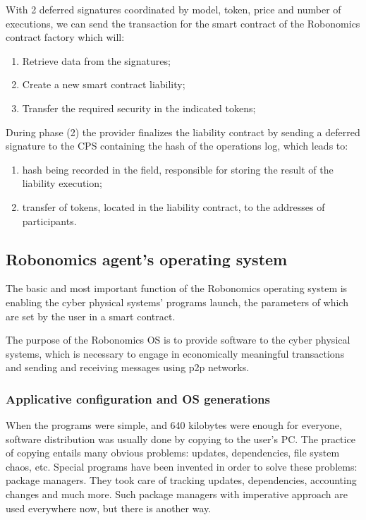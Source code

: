 \documentclass{article}
\begin{document}
With 2 deferred signatures coordinated by model, token, price and number of executions, we can send the transaction for the smart contract of the Robonomics contract factory which will:

\begin{enumerate}
	\item Retrieve data from the signatures;
	\item Create a new smart contract liability;
	\item Transfer the required security in the indicated tokens;
\end{enumerate}

During phase (2) the provider finalizes the liability contract by sending a deferred signature to the CPS containing the hash of the operations log, which leads to:
\begin{enumerate}
	\item hash being recorded in the field, responsible for storing the result of the liability execution;
	\item transfer of tokens, located in the liability contract, to the addresses of participants.
\end{enumerate}

\subsection{Robonomics agent's operating system}

The basic and most important function of the Robonomics operating system is enabling the cyber physical systems' programs launch, the parameters of which are set by the user in a smart contract.

The purpose of the Robonomics OS is to provide software to the cyber physical systems, which is necessary to engage in economically meaningful transactions and sending and receiving messages using p2p networks.

\subsubsection{Applicative configuration and OS generations}
When the programs were simple, and 640 kilobytes were enough for everyone, software distribution was usually done by copying to the user's PC. The practice of copying entails many obvious problems: updates, dependencies, file system chaos, etc. Special programs have been invented in order to solve these problems: package managers. They took care of tracking updates, dependencies, accounting changes and much more. Such package managers with imperative approach are used everywhere now, but there is another way.
\end{document}

